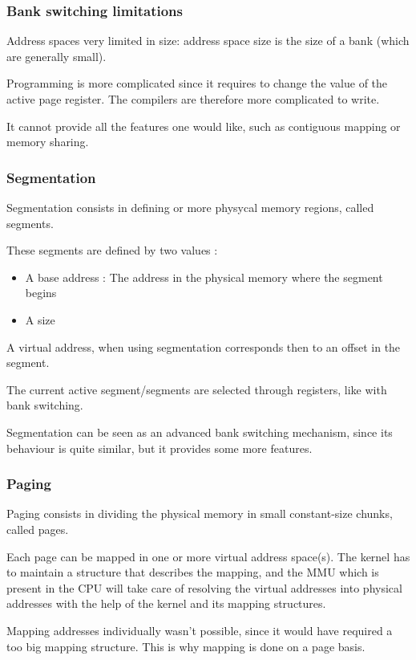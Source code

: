 \begin{frame}
  \frametitle{Bank switching limitations}

  Address spaces very limited in size: address space size is the size of a bank (which are generally small).

  \-

  Programming is more complicated since it requires to change the value of the active page register. The compilers are therefore more complicated to write.

  \-

  It cannot provide all the features one would like, such as contiguous mapping or memory sharing.

\end{frame}

\begin{frame}
  \frametitle{Segmentation}

  Segmentation consists in defining or more physycal memory regions, called segments.
  
  \-
  
  These segments are defined by two values :
  \begin{itemize}
  \item A base address : The address in the physical memory where the segment begins
  \item A size
  \end{itemize}

  \-

  A virtual address, when using segmentation corresponds then to an offset in the segment.

  \-

  The current active segment/segments are selected through registers, like with bank switching.

  \-

  Segmentation can be seen as an advanced bank switching mechanism, since its behaviour is quite similar, but it provides some more features.

\end{frame}


\begin{frame}
  \frametitle{Paging}

  Paging consists in dividing the physical memory in small constant-size chunks, called pages.

  \-

  Each page can be mapped in one or more virtual address space(s). The kernel has to maintain a structure that describes the mapping, and the MMU which is present in the CPU will take care of resolving the virtual addresses into physical addresses with the help of the kernel and its mapping structures.

  \-

  Mapping addresses individually wasn't possible, since it would have required a too big mapping structure. This is why mapping is done on a page basis.

\end{frame}

